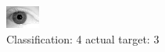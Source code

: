\begin{figure}[h!]
\begin{center}
\includegraphics[width=0.60\columnwidth]{figures/ID2114_class_4_target_3.png}
\end{center}
\caption{ Classification: 4 actual target: 3}
\label{fig:ID2114_class_4_target_3}
\end{figure}
